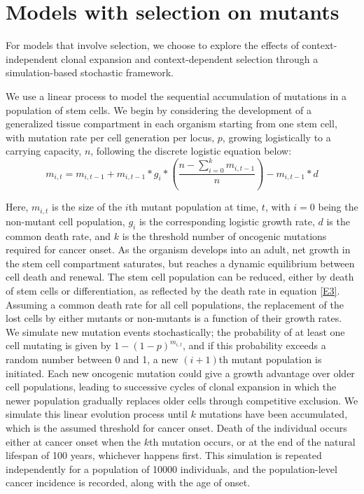 \documentclass[12pt,onecolumn,twoside]{article}
\begin{document}
\section{Models with selection on mutants}
For models that involve selection, we choose to explore the effects of context-independent clonal expansion and context-dependent selection through a simulation-based stochastic framework. 

We use a linear process to model the sequential accumulation of mutations in a population of stem cells. We begin by considering the development of a generalized tissue compartment in each organism starting from one stem cell, with mutation rate per cell generation per locus, $p$, growing logistically to a carrying capacity, $n$, following the discrete logistic equation below:
\begin{equation}
	m_{i, t} = m_{i, t-1} + m_{i, t-1}*g_{i}*(\dfrac{n-\sum_{i=0}^{k} m_{i, t-1}}{n}) - m_{i, t-1}*d
	\label{E3}	
\end{equation}

Here, $m_{i, t}$ is the size of the $i$th mutant population at time, $t$, with $i=0$ being the non-mutant cell population, $g_{i}$ is the corresponding logistic growth rate, $d$ is the common death rate, and $k$ is the threshold number of oncogenic mutations required for cancer onset. As the organism develops into an adult, net growth in the stem cell compartment saturates, but reaches a dynamic equilibrium between cell death and renewal. The stem cell population can be reduced, either by death of stem cells or differentiation, as reflected by the death rate in equation \ref{E3}. Assuming a common death rate for all cell populations, the replacement of the lost cells by either mutants or non-mutants is a function of their growth rates. We simulate new mutation events stochastically; the probability of at least one cell mutating is given by $1-(1-p)^{m_{i, t}}$, and if this probability exceeds a random number between 0 and 1, a new $(i+1)$th mutant population is initiated. Each new oncogenic mutation could give a growth advantage over older cell populations, leading to successive cycles of clonal expansion in which the newer population gradually replaces older cells through competitive exclusion. We simulate this linear evolution process until $k$ mutations have been accumulated, which is the assumed threshold for cancer onset. Death of the individual occurs either at cancer onset when the $k$th mutation occurs, or at the end of the natural lifespan of 100 years, whichever happens first. This simulation is repeated independently for a population of 10000 individuals, and the population-level cancer incidence is recorded, along with the age of onset.
\end{document}
